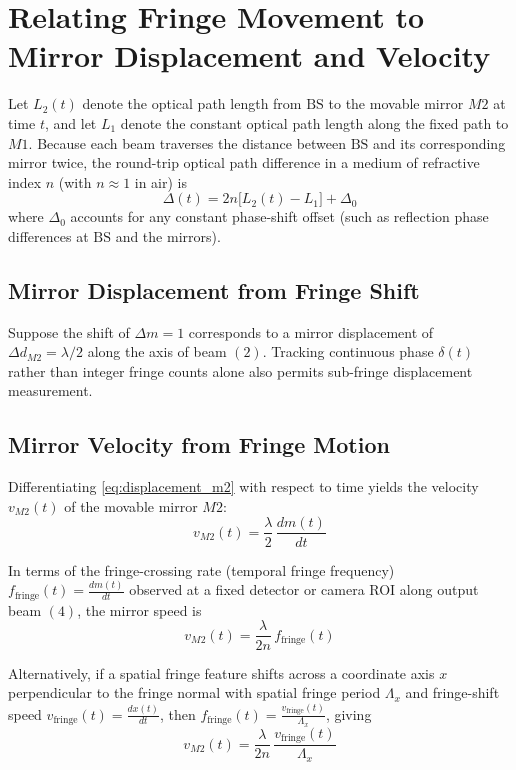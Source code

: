 
\section{Relating Fringe Movement to Mirror Displacement and Velocity}
\label{sec:fringe_to_displacement_velocity}

Let $L_2(t)$ denote the optical path length from $\text{BS}$ to the movable mirror $M2$ at time $t$, and let $L_1$ denote the constant optical path length along the fixed path to $M1$. Because each beam traverses the distance between $\text{BS}$ and its corresponding mirror twice, the round-trip optical path difference in a medium of refractive index $n$ (with $n \approx 1$ in air) is
\begin{equation}
    \Delta(t) = 2n\bigl[L_2(t) - L_1\bigr] + \Delta_0
    \label{eq:opd_m2}
\end{equation}
where $\Delta_0$ accounts for any constant phase-shift offset (such as reflection phase differences at $\text{BS}$ and the mirrors).

\subsection{Mirror Displacement from Fringe Shift}
Suppose the shift of $\Delta m = 1$ corresponds to a mirror displacement of $\Delta d_{M2} = \lambda/2$ along the axis of beam $(2)$. Tracking continuous phase $\delta(t)$ rather than integer fringe counts alone also permits sub-fringe displacement measurement.

\subsection{Mirror Velocity from Fringe Motion}
Differentiating \cref{eq:displacement_m2} with respect to time yields the velocity $v_{M2}(t)$ of the movable mirror $M2$:
\begin{equation}
    v_{M2}(t) = \frac{\lambda}{2}\,\frac{dm(t)}{dt}
    \label{eq:velocity_m2}
\end{equation}

In terms of the fringe-crossing rate (temporal fringe frequency) $f_{\text{fringe}}(t) = \frac{dm(t)}{dt}$ observed at a fixed detector or camera ROI along output beam $(4)$, the mirror speed is
\begin{equation}
    v_{M2}(t) = \frac{\lambda}{2n}\,f_{\text{fringe}}(t)
    \label{eq:velocity_fringe_rate}
\end{equation}


Alternatively, if a spatial fringe feature shifts across a coordinate axis $x$ perpendicular to the fringe normal with spatial fringe period $\Lambda_x$ and fringe-shift speed $v_{\text{fringe}}(t) = \frac{dx(t)}{dt}$, then $f_{\text{fringe}}(t) = \frac{v_{\text{fringe}}(t)}{\Lambda_x}$, giving
\begin{equation}
    v_{M2}(t) = \frac{\lambda}{2n}\,\frac{v_{\text{fringe}}(t)}{\Lambda_x}
    \label{eq:velocity_spatial_shift}
\end{equation}


